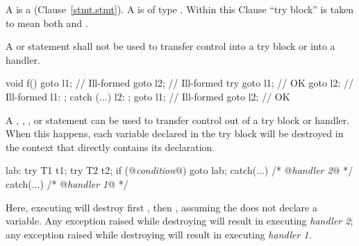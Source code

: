 \pnum
{}%
%
%
%
A  is a  (Clause~\ref{stmt.stmt}).
A  is of type . \enternote Within this Clause
``try block'' is taken to mean both  and
. \exitnote

\pnum
{}%
%
%
%
%
%
A  or  statement shall not be used to transfer control
into a try block or into a handler.
\enterexample
\begin{codeblock}
void f() {
  goto l1;          // Ill-formed
  goto l2;          // Ill-formed
  try {
    goto l1;        // OK
    goto l2;        // Ill-formed
    l1: ;
  } catch (...) {
    l2: ;
    goto l1;        // Ill-formed
    goto l2;        // OK
  }
}

\end{codeblock}
\exitexample
{}%
%
%
%
%
%
%
%
A
,
,
,
or
statement can be used to transfer control out of
a try block or handler.
When this happens, each variable declared in the try block
will be destroyed in the context that
directly contains its declaration.
\enterexample

\begin{codeblock}
lab:  try {
  T1 t1;
  try {
    T2 t2;
    if (@\textit{condition}@)
      goto lab;
    } catch(...) { /* @\textit{handler 2}@ */ }
  } catch(...) { /* @\textit{handler 1}@ */ }
\end{codeblock}

Here, executing
will destroy first
,
then
,
assuming the
does not declare a variable.
Any exception raised while destroying
will result in executing
\textit{handler 2};
any exception raised while destroying
will result in executing
\textit{handler 1}.
\exitexample


